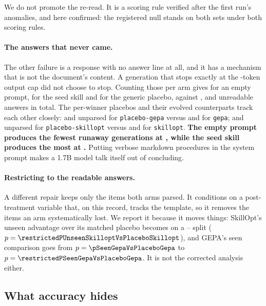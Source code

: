 We do not promote the re-read. It is a scoring rule verified after the first
run's anomalies, and here confirmed: the registered null stands on both sets
under both scoring rules.

\paragraph{The answers that never came.} The other failure is a response with
no answer line at all, and it has a mechanism that is not the document's
content. A generation that stops exactly at the \NUM{\outputCap}-token output
cap did not choose to stop. Counting those per arm gives \NUM{\atCapOff} for
an empty prompt, \NUM{\atCapOn} for the seed skill and \NUM{\atCapPlacebo} for
the generic placebo, against \NUM{\unparsedOff}, \NUM{\unparsedOn} and
\NUM{\unparsedPlacebo} unreadable answers in total. The per-winner placebos
and their evolved counterparts track each other closely: \NUM{\atCapPlaceboGepa}
and \NUM{\unparsedPlaceboGepa} unparsed for \texttt{placebo-gepa} versus
\NUM{\atCapGepa} and \NUM{\unparsedGepa} for \texttt{gepa}; \NUM{\atCapPlaceboSkillopt}
and \NUM{\unparsedPlaceboSkillopt} unparsed for \texttt{placebo-skillopt} versus
\NUM{\atCapSkillopt} and \NUM{\unparsedSkillopt} for \texttt{skillopt}.
\textbf{The empty prompt produces the fewest runaway generations at \NUM{\atCapOff},
while the seed skill produces the most at \NUM{\atCapOn}.} Putting verbose markdown
procedures in the system prompt makes a 1.7B model talk itself out of concluding.

\paragraph{Restricting to the readable answers.} A different repair keeps
only the items both arms parsed. It conditions on a post-treatment variable
that, on this record, tracks the template, so it removes the
items an arm systematically lost. We report it because it moves things:
SkillOpt's unseen advantage over its matched placebo becomes
\NUM{\restrictedUnseenSkilloptVsPlaceboSkillopt} on a
\NUM{\restrictedWinsUnseenSkilloptVsPlaceboSkillopt}--\NUM{\restrictedLossesUnseenSkilloptVsPlaceboSkillopt}
split ($p = \NUM{\restrictedPUnseenSkilloptVsPlaceboSkillopt}$), and GEPA's seen comparison goes from $p = \NUM{\pSeenGepaVsPlaceboGepa}$ to
$p = \NUM{\restrictedPSeenGepaVsPlaceboGepa}$. It is not the corrected analysis either.

\subsection{What accuracy hides}
\label{sec:signal}

